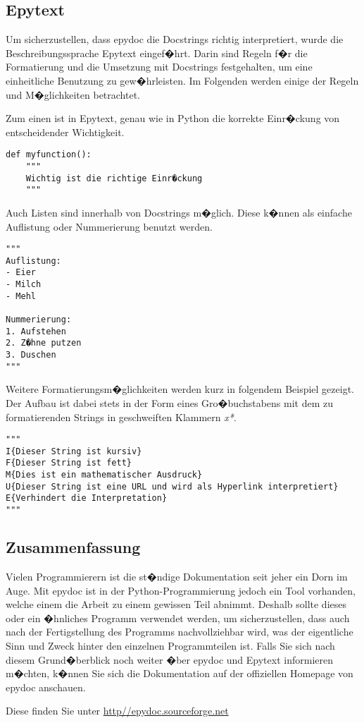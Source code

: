 \subsection*{Epytext}
\label{documentation:sec:Epytext}
Um sicherzustellen, dass epydoc die Docstrings richtig interpretiert, wurde die Beschreibungssprache Epytext eingef�hrt. Darin sind Regeln f�r die Formatierung und die Umsetzung mit Docstrings festgehalten, um eine einheitliche Benutzung zu gew�hrleisten. 
Im Folgenden werden einige der Regeln und M�glichkeiten betrachtet.

Zum einen ist in Epytext, genau wie in Python die korrekte Einr�ckung von entscheidender Wichtigkeit.

\begin{lstlisting}[label=documentation:lst:einrueckung]
def myfunction(): 
	"""
	Wichtig ist die richtige Einr�ckung
	"""
\end{lstlisting}

Auch Listen sind innerhalb von Docstrings m�glich. Diese k�nnen als einfache Auflistung oder  Nummerierung benutzt werden.
\begin{lstlisting}[label=documentation:lst:liste]
"""
Auflistung:
- Eier
- Milch
- Mehl

Nummerierung:
1. Aufstehen
2. Z�hne putzen
3. Duschen
"""
\end{lstlisting}

Weitere Formatierungsm�glichkeiten werden kurz in folgendem Beispiel gezeigt. Der Aufbau ist dabei stets in der Form eines Gro�buchstabens mit dem zu formatierenden Strings in geschweiften Klammern \textit{x{*}}.

\begin{lstlisting}[label=documentation:lst:liste]
"""
I{Dieser String ist kursiv}
F{Dieser String ist fett}
M{Dies ist ein mathematischer Ausdruck}
U{Dieser String ist eine URL und wird als Hyperlink interpretiert}
E{Verhindert die Interpretation}
"""
\end{lstlisting}

\subsection*{Zusammenfassung}
\label{documentation:sec:zusammenfassung}
Vielen Programmierern ist die st�ndige Dokumentation seit jeher ein Dorn im Auge. Mit epydoc ist in der Python-Programmierung jedoch ein Tool vorhanden, welche einem die Arbeit zu einem gewissen Teil abnimmt. Deshalb sollte dieses oder ein �hnliches Programm verwendet werden, um sicherzustellen, dass auch nach der Fertigstellung des Programms nachvollziehbar wird, was der eigentliche Sinn und Zweck hinter den einzelnen Programmteilen ist. 
Falls Sie sich nach diesem Grund�berblick noch weiter �ber epydoc und Epytext informieren m�chten, k�nnen Sie sich die Dokumentation auf der offiziellen Homepage von epydoc anschauen.

Diese finden Sie unter \url{http//epydoc.sourceforge.net}